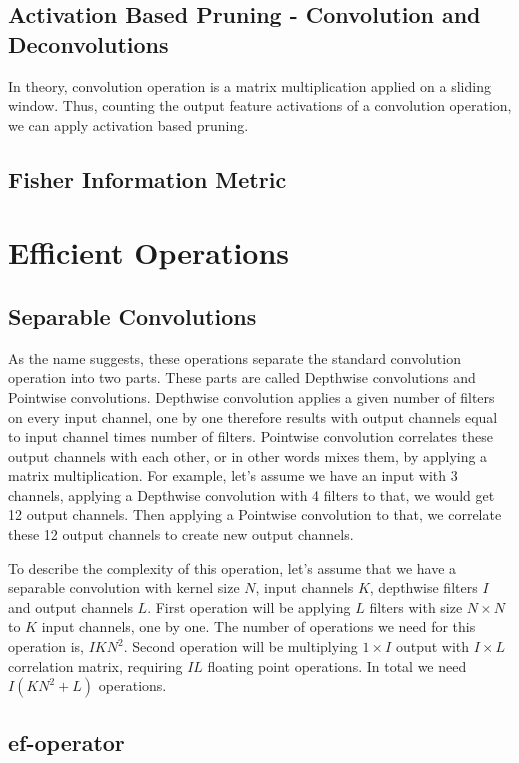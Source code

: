 \subsection{Activation Based Pruning - Convolution and Deconvolutions}
In theory, convolution operation is a matrix multiplication applied on a sliding window. Thus, counting the output feature activations of a convolution operation, we can apply activation based pruning. 

\subsection{Fisher Information Metric}

\section{Efficient Operations}
\subsection{Separable Convolutions}
As the name suggests, these operations separate the standard convolution operation into two parts. These parts are called Depthwise convolutions and Pointwise convolutions. Depthwise convolution applies a given number of filters on every input channel, one by one therefore results with output channels equal to input channel times number of filters. Pointwise convolution correlates these output channels with each other, or in other words mixes them, by applying a matrix multiplication. For example, let's assume we have an input with 3 channels, applying a Depthwise convolution with 4 filters to that, we would get 12 output channels. Then applying a Pointwise convolution to that, we correlate these 12 output channels to create new output channels. 

To describe the complexity of this operation, let's assume that we have a separable convolution with kernel size $N$, input channels $K$, depthwise filters $I$ and output channels $L$. First operation will be applying $L$ filters with size $N \times N$ to $K$ input channels, one by one. The number of operations we need for this operation is, $IKN^2$. Second operation will be multiplying $1 \times I$ output with $I \times L$ correlation matrix, requiring $IL$ floating point operations. In total we need $I(KN^2+L)$ operations. 
\subsection{ef-operator}

